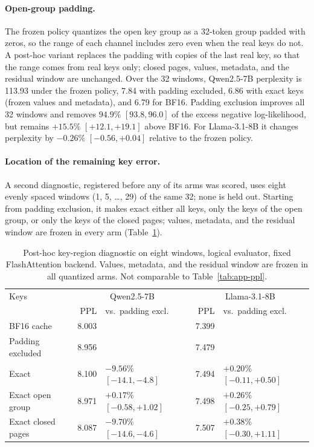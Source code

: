 \documentclass{article}
\begin{document}
\paragraph{Open-group padding.}
The frozen policy quantizes the open key group as a 32-token group padded with zeros, so the range of
each channel includes zero even when the real keys do not. A post-hoc variant replaces the padding with
copies of the last real key, so that the range comes from real keys only; closed pages, values,
metadata, and the residual window are unchanged. Over the 32 windows, Qwen2.5-7B perplexity is 113.93
under the frozen policy, 7.84 with padding excluded, 6.86 with exact keys (frozen values and metadata),
and 6.79 for BF16. Padding exclusion improves all 32 windows and removes $94.9\%$ $[93.8, 96.0]$ of the
excess negative log-likelihood, but remains $+15.5\%$ $[+12.1, +19.1]$ above BF16. For Llama-3.1-8B it
changes perplexity by $-0.26\%$ $[-0.56, +0.04]$ relative to the frozen policy.

\paragraph{Location of the remaining key error.}
A second diagnostic, registered before any of its arms was scored, uses eight evenly spaced windows
(1, 5, \ldots, 29) of the same 32; none is held out. Starting from padding exclusion, it makes exact
either all keys, only the keys of the open group, or only the keys of the closed pages; values,
metadata, and the residual window are frozen in every arm (Table~\ref{tab:app-qwen-diag}).

\begin{table}[t]
\centering
\small
\setlength{\tabcolsep}{3pt}
\begin{tabular}{@{}lrlrl@{}}
\toprule
Keys & \multicolumn{2}{c}{Qwen2.5-7B} & \multicolumn{2}{c}{Llama-3.1-8B} \\
 & PPL & vs.\ padding excl. & PPL & vs.\ padding excl. \\
\midrule
BF16 cache & 8.003 & & 7.399 & \\
Padding excluded & 8.956 & & 7.479 & \\
Exact & 8.100 & $-9.56\%$ $[-14.1, -4.8]$ & 7.494 & $+0.20\%$ $[-0.11, +0.50]$ \\
Exact open group & 8.971 & $+0.17\%$ $[-0.58, +1.02]$ & 7.498 & $+0.26\%$ $[-0.25, +0.79]$ \\
Exact closed pages & 8.087 & $-9.70\%$ $[-14.6, -4.6]$ & 7.507 & $+0.38\%$ $[-0.30, +1.11]$ \\
\bottomrule
\end{tabular}
\caption{Post-hoc key-region diagnostic on eight windows, logical evaluator, fixed FlashAttention
backend. Values, metadata, and the residual window are frozen in all quantized arms. Not comparable to
Table~\ref{tab:app-ppl}.}
\label{tab:app-qwen-diag}
\end{table}
\end{document}
